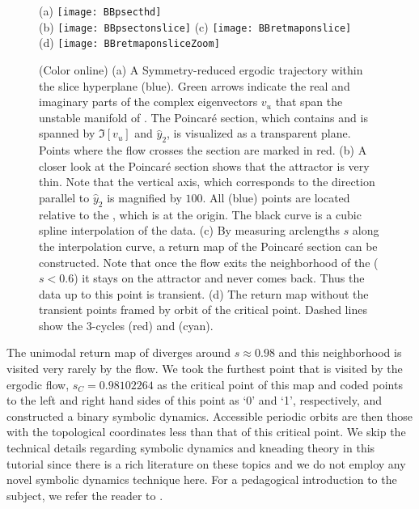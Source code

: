 \begin{figure}
\centering
  (a) \texttt{[image: BBpsecthd]} \\
  (b) \texttt{[image: BBpsectonslice]}
  (c) \texttt{[image: BBretmaponslice]} \\
  (d) \texttt{[image: BBretmaponsliceZoom]}
\caption{(Color online)
         (a) A Symmetry-reduced ergodic trajectory within the slice hyperplane 
             (blue). Green arrows indicate the real and imaginary parts of the 
             complex eigenvectors $v_u$ that span the unstable manifold of 
             \REQV{}{}. The Poincar\'e section, which contains \REQV{}{} and 
             is spanned by $\Im[v_u]$ and $\hat{y}_2$, is visualized as a 
             transparent plane. Points where the flow crosses the section are marked 
             in red.
                 (b) A closer look at the Poincar\'e section shows that the attractor is very thin.
                         Note that the vertical axis, which corresponds to the direction 
                         parallel to $\hat{y}_2$ is magnified by $100$. All (blue) points 
                         are located relative to the \REQV{}{}, which is at the origin.
                         The black curve is a cubic spline interpolation of the data.                   
                 (c) By measuring arclengths $s$ along the interpolation curve, a return map 
                 of the Poincar\'e section can be constructed.
                         Note that once the flow exits the neighborhood of the \REQV{}{} 
                         ($s < 0.6$) it stays on the attractor and never comes back. Thus the data 
                         up to this point is transient.
                 (d) The return map without the transient points framed by orbit of the 
                     critical point. Dashed lines show the 3-cycles  (red) and 
                      (cyan).}
\label{fig:psectandretmap}
\end{figure}

The unimodal return map of  diverges around
$s \approx 0.98$ and this neighborhood is visited very rarely by the flow. We
took the furthest point that is visited by the ergodic flow, $s_C=0.98102264$
as the critical point of this map and coded points to the left and right hand sides of this
point as `0' and `1', respectively, and constructed a binary symbolic dynamics.
Accessible periodic orbits are then those with the topological coordinates
less than that of this critical point. We skip the technical details
regarding symbolic dynamics and kneading theory in this tutorial since
there is a rich literature on these topics and we do not employ any novel
symbolic dynamics technique here. For a pedagogical introduction to the
subject, we refer the reader to .

